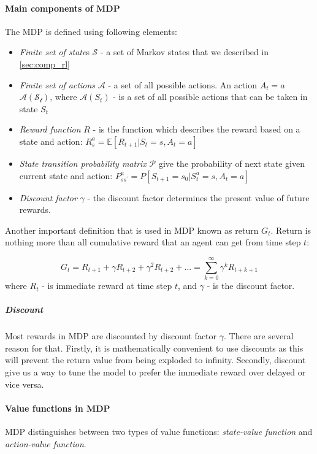 \paragraph{Main components of MDP} The MDP is defined using following elements:
\begin{itemize}
	\item \emph{Finite set of state}s $\mathcal{S}$ - a set of Markov states that we described in \autoref{sec:comp_rl}
	\item \emph{Finite set of actions} $\mathcal{A}$ - a set of all possible actions.
		An action $A_t = a$ \in $\mathcal{A(S_t)}$, where $\mathcal{A}(S_t)$ -
		is a set of all possible actions that can be taken in state $S_t$
	\item \emph{Reward function} $R$ - is the function which describes
		the reward based on a state and action: $R_s^a = \mathbb{E}[R_{t+1}| S_t = s, A_t = a]$
	\item \emph{State transition probability matrix} $\mathcal{P}$ give
		the probability of next state given current state and action: $P^a_{ss^{\prime}} = P[S_{t+1} = s_0 | S_t^a = s, A_t = a]$
	\item \emph{Discount factor} $\gamma$ - the discount factor determines the present value
	 	of future rewards.
\end{itemize}

Another important definition that is used in MDP known as return $G_t$. Return is nothing
more than all cumulative reward that an agent can get from time step $t$:

\begin{equation} \label{eq:return}
	G_t = R_{t+1} + \gamma R_{t+2} + \gamma^2 R_{t+2} + ... = \sum_{k=0}^{\infty} \gamma^k R_{t+k+1}
\end{equation}
where $R_t$ - is immediate reward at time step $t$,
and $\gamma$ - is the discount factor.

\subparagraph{Discount} Most rewards in MDP are discounted by discount factor $\gamma$.
There are several reason for that. Firstly, it is mathematically convenient
to use discounts as this will prevent the return value from being exploded to infinity.
Secondly, discount give us a way to tune the model to prefer the immediate reward over
delayed or vice versa.
\paragraph{Value functions in MDP} MDP distinguishes between two types of value functions:
\emph{state-value function} and \emph{action-value function}.

